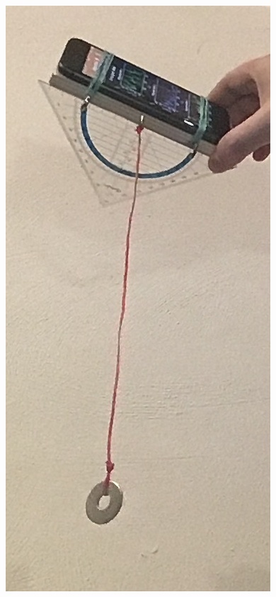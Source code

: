 \documentclass[../main.tex]{subfiles}
\begin{document}
\begin{tcolorbox}
\begin{minipage}[]{0.8\textwidth}
    \end{minipage}
    \hspace{0.3cm}
    \begin{minipage}[]{0.15\textwidth}
        \vspace{0.3cm}
        \includegraphics[width=\textwidth]{img/versuchsaufbau}
    \end{minipage}


\end{tcolorbox}
\end{document}
